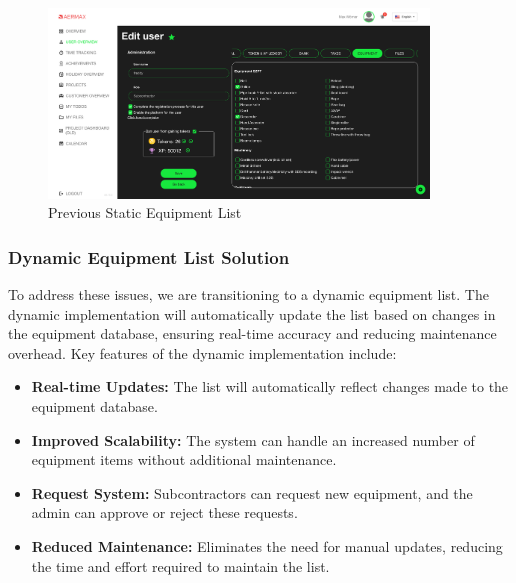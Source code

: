     \begin{figure}[H]
        \centering
        \includegraphics[width=0.9\textwidth]{src/assets/chapters/StaticDynamicEquipementList.png}
        \caption{Previous Static Equipment List}
        \label{fig:static_equipment_list}
    \end{figure}
    
    \subsubsection{Dynamic Equipment List Solution}
    To address these issues, we are transitioning to a dynamic equipment list. The dynamic implementation will automatically update the list based on changes in the equipment database, ensuring real-time accuracy and reducing maintenance overhead. Key features of the dynamic implementation include:
    \begin{itemize}
        \item \textbf{Real-time Updates:} The list will automatically reflect changes made to the equipment database.
        \item \textbf{Improved Scalability:} The system can handle an increased number of equipment items without additional maintenance.
        \item \textbf{Request System:} Subcontractors can request new equipment, and the admin can approve or reject these requests.
        \item \textbf{Reduced Maintenance:} Eliminates the need for manual updates, reducing the time and effort required to maintain the list.
    \end{itemize}
    
